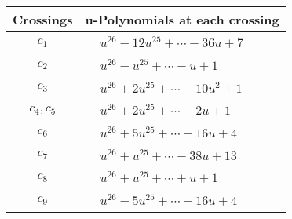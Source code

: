 \documentclass[1p]{elsarticle_modified}
\theoremstyle{definition}
\begin{document}
\begin{tabular}{m{50pt}|m{274pt}}
Crossings & \hspace{64pt}u-Polynomials at each crossing \\
\hline $$\begin{aligned}c_{1}\end{aligned}$$&$\begin{aligned}
&u^{26}-12 u^{25}+\cdots-36 u+7
\end{aligned}$\\
\hline $$\begin{aligned}c_{2}\end{aligned}$$&$\begin{aligned}
&u^{26}- u^{25}+\cdots- u+1
\end{aligned}$\\
\hline $$\begin{aligned}c_{3}\end{aligned}$$&$\begin{aligned}
&u^{26}+2 u^{25}+\cdots+10 u^2+1
\end{aligned}$\\
\hline $$\begin{aligned}c_{4},c_{5}\end{aligned}$$&$\begin{aligned}
&u^{26}+2 u^{25}+\cdots+2 u+1
\end{aligned}$\\
\hline $$\begin{aligned}c_{6}\end{aligned}$$&$\begin{aligned}
&u^{26}+5 u^{25}+\cdots+16 u+4
\end{aligned}$\\
\hline $$\begin{aligned}c_{7}\end{aligned}$$&$\begin{aligned}
&u^{26}+u^{25}+\cdots-38 u+13
\end{aligned}$\\
\hline $$\begin{aligned}c_{8}\end{aligned}$$&$\begin{aligned}
&u^{26}+u^{25}+\cdots+u+1
\end{aligned}$\\
\hline $$\begin{aligned}c_{9}\end{aligned}$$&$\begin{aligned}
&u^{26}-5 u^{25}+\cdots-16 u+4
\end{aligned}$\\

\end{tabular}
\end{document}
